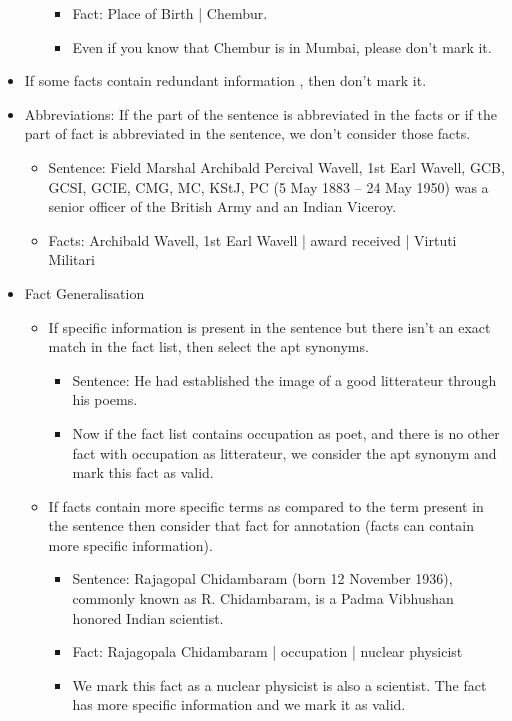 \documentclass[11pt]{article}
\begin{document}
\begin{itemize}
\begin{itemize}
\begin{itemize}
\item Fact: Place of Birth | Chembur.
\item Even if you know that Chembur is in Mumbai, please don't mark it.
\end{itemize}
\end{itemize}
\item If some facts contain redundant information , then don’t mark it.
\item Abbreviations: If the part of the sentence is abbreviated in the facts or if the part of fact is abbreviated in the sentence, we don't consider those facts.
\begin{itemize}
\item Sentence: Field Marshal Archibald Percival Wavell, 1st Earl Wavell, GCB, GCSI, GCIE, CMG, MC, KStJ, PC (5 May 1883 – 24 May 1950) was a senior officer of the British Army and an Indian Viceroy.
\item Facts: Archibald Wavell, 1st Earl Wavell | award received | Virtuti Militari
\end{itemize}
\item Fact Generalisation 
\begin{itemize}
    \item If specific information is present in the sentence but there isn't an exact match in the fact list, then select the apt synonyms.
    \begin{itemize}
        \item Sentence: He had established the image of a good litterateur through his poems.
        \item Now if the fact list contains occupation as poet, and there is no other fact with occupation as litterateur, we consider the apt synonym and mark this fact as valid. 
    \end{itemize}
    \item If facts contain more specific terms as compared to the term present in the sentence then consider that fact for annotation (facts can contain more specific information).
    \begin{itemize}
        \item Sentence: Rajagopal Chidambaram (born 12 November 1936), commonly known as R. Chidambaram, is a Padma Vibhushan honored Indian scientist.
        \item Fact: Rajagopala Chidambaram | occupation | nuclear physicist
        \item We mark this fact as a nuclear physicist is also a scientist. The fact has more specific information and we mark it as valid.  
    \end{itemize}
\end{itemize}
\end{itemize}
\end{document}
